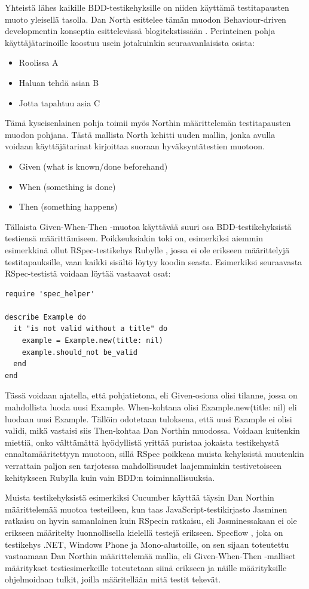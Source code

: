 \documentclass[finnish,nonumbib,nocopyright]{gradu2}
\begin{document}
Yhteistä lähes kaikille BDD-testikehyksille on niiden käyttämä testitapausten muoto yleisellä tasolla. Dan North esittelee tämän muodon Behaviour-driven developmentin konseptia esittelevässä blogitekstissään \cite{bddintro}. Perinteinen pohja käyttäjätarinoille koostuu usein jotakuinkin seuraavanlaisista osista:
\begin{itemize}
\item Roolissa A
\item Haluan tehdä asian B
\item Jotta tapahtuu asia C
\end{itemize}
Tämä kyseisenlainen pohja toimii myös Northin määrittelemän testitapausten muodon pohjana. Tästä mallista North kehitti uuden mallin, jonka avulla voidaan käyttäjätarinat kirjoittaa suoraan hyväksyntätestien muotoon.
\begin{itemize}
\item Given (what is known/done beforehand)
\item When (something is done)
\item Then (something happens)
\end{itemize}
Tällaista Given-When-Then -muotoa käyttävää suuri osa BDD-testikehyksistä testiensä määrittämiseen. Poikkeuksiakin toki on, esimerkiksi aiemmin esimerkkinä ollut RSpec-testikehys Rubylle \cite{rspec}, jossa ei ole erikseen määrittelyjä testitapauksille, vaan kaikki sisältö löytyy koodin seasta. Esimerkiksi seuraavasta RSpec-testistä voidaan löytää vastaavat osat:
\begin{verbatim}
require 'spec_helper'

describe Example do
  it "is not valid without a title" do
    example = Example.new(title: nil)
    example.should_not be_valid
  end
end
\end{verbatim}
Tässä voidaan ajatella, että pohjatietona, eli Given-osiona olisi tilanne, jossa on mahdollista luoda uusi Example. When-kohtana olisi Example.new(title: nil) eli luodaan uusi Example. Tällöin odotetaan tuloksena, että uusi Example ei olisi validi, mikä vastaisi siis Then-kohtaa Dan Northin muodossa. Voidaan kuitenkin miettiä, onko välttämättä hyödyllistä yrittää puristaa jokaista testikehystä ennaltamääritettyyn muotoon, sillä RSpec poikkeaa muista kehyksistä muutenkin verrattain paljon sen tarjotessa mahdollisuudet laajemminkin testivetoiseen kehitykseen Rubylla kuin vain BDD:n toiminnallisuuksia.

Muista testikehyksistä esimerkiksi Cucumber \cite{cucumberbook} käyttää täysin Dan Northin määrittelemää muotoa \cite{bddintro} testeilleen, kun taas JavaScript-testikirjasto Jasminen \cite{jasmine} ratkaisu on hyvin samanlainen kuin RSpecin ratkaisu, eli Jasminessakaan ei ole erikseen määritelty luonnollisella kielellä testejä erikseen. Specflow \cite{specflow}, joka on testikehys .NET, Windows Phone ja Mono-alustoille, on sen sijaan toteutettu vastaamaan Dan Northin määrittelemää mallia, eli Given-When-Then -malliset määritykset testiesimerkeille toteutetaan siinä erikseen ja näille määrityksille ohjelmoidaan tulkit, joilla määritellään mitä testit tekevät.
\end{document}
